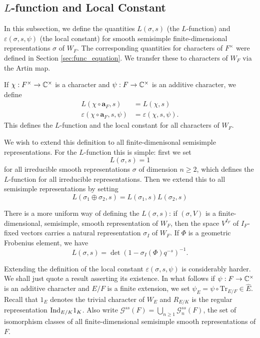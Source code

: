 \subsection{\texorpdfstring{$L$}{TEXT}-function and Local Constant}
In this subsection, we define the quantities $L(\sigma, s)$ (the $L$-function) and $\varepsilon(\sigma, s, \psi)$ (the local constant) for smooth semisimple finite-dimensional representations $\sigma$ of $W_F$. The corresponding quantities for characters of $F^\times$ were defined in Section \ref{sec:func_equation}. We transfer these to characters of $W_F$ via the Artin map.
\begin{defn}
	If $\chi: F^\times \to \mathbb{C}^\times$ is a character and $\psi: F\to \mathbb{C}^\times$ is an additive character, we define
	\begin{align*}
		L(\chi\circ\mathbf{a}_F, s) &= L(\chi, s)\\
		\varepsilon(\chi\circ\mathbf{a}_F, s, \psi) &= \varepsilon(\chi, s, \psi).
	\end{align*}
	This defines the $L$-function and the local constant for all characters of $W_F$.
\end{defn}
We wish to extend this definition to all finite-dimenisonal semisimple representations. For the $L$-function this is simple: first we set
\[L(\sigma, s) = 1\]
for all irreducible smooth representations $\sigma$ of dimension $n\ge 2$, which defines the $L$-function for all irreducible representations. Then we extend this to all semisimple representations by setting
\[L(\sigma_1\oplus \sigma_2, s) = L(\sigma_1, s)L(\sigma_2, s)\]
\begin{rem}
	There is a more uniform way of defining the $L(\sigma, s)$: if $(\sigma, V)$ is a finite-dimensional, semisimple, smooth representation of $W_F$, then the space $V^{I_F}$ of $I_F$-fixed vectors carries a natural representation $\sigma_{I}$ of $W_F$. If $\Phi$ is a geometric Frobenius element, we have
	\[L(\sigma, s) = \det(1 - \sigma_I(\Phi)q^{-s})^{-1}.\] 
\end{rem}
Extending the definition of the local constant $\varepsilon(\sigma, s, \psi)$ is considerably harder. We shall just quote a result asserting its existence. In what follows if $\psi: F\to \mathbb{C}^\times$ is an additive character and $E/F$ is a finite extension, we set $\psi_E = \psi \circ \mathrm{Tr}_{E/F}\in \widehat{E}$. Recall that $1_E$ denotes the trivial character of $W_E$ and $R_{E/K}$ is the regular representation $\mathrm{Ind}_{E/K} 1_K$. Also write $\mathcal{G}^{ss}(F) = \bigcup_{n\ge 1} \mathcal{G}^{ss}_n(F)$, the set of isomorphism classes of all finite-dimensional semisimple smooth representations of $F$.
